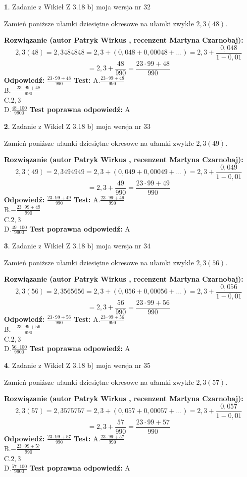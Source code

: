 \documentclass[12pt, a4paper]{article}
\theoremstyle{definition} %
\newtheorem{zad}{}
\newcommand{\zadStart}[1]{\begin{zad}#1\newline}
\newcommand{\zadStop}{\end{zad}}
\newcommand{\rozwStart}[2]{\noindent \textbf{Rozwiązanie (autor #1 , recenzent #2): }\newline}
\newcommand{\rozwStop}{\newline}
\newcommand{\odpStart}{\noindent \textbf{Odpowiedź:}\newline}
\newcommand{\odpStop}{\newline}
\newcommand{\testStart}{\noindent \textbf{Test:}\newline}
\newcommand{\testStop}{\newline}
\newcommand{\kluczStart}{\noindent \textbf{Test poprawna odpowiedź:}\newline}
\newcommand{\kluczStop}{\newline}
\begin{document}
\zadStart{Zadanie z Wikieł Z 3.18 b) moja wersja nr 32}

Zamień poniższe ułamki dziesiętne okresowe na ułamki zwykłe $2,3(48)$.
\zadStop
\rozwStart{Patryk Wirkus}{Martyna Czarnobaj}
$$2,3(48)=2,3484848=2,3+(0,048+0,00048+...)=2,3+\frac{0,048}{1-0,01}$$
$$=2,3+\frac{48}{990}=\frac{23\cdot99+48}{990}$$
\rozwStop
\odpStart
$\frac{23\cdot99+48}{990}$
\odpStop
\testStart
A.$\frac{23\cdot99+48}{990}$\\ B.$-\frac{23\cdot99+48}{990}$\\ C.$2,3$\\ D.$\frac{48\cdot100}{9900}$
\testStop
\kluczStart
A
\kluczStop



\zadStart{Zadanie z Wikieł Z 3.18 b) moja wersja nr 33}

Zamień poniższe ułamki dziesiętne okresowe na ułamki zwykłe $2,3(49)$.
\zadStop
\rozwStart{Patryk Wirkus}{Martyna Czarnobaj}
$$2,3(49)=2,3494949=2,3+(0,049+0,00049+...)=2,3+\frac{0,049}{1-0,01}$$
$$=2,3+\frac{49}{990}=\frac{23\cdot99+49}{990}$$
\rozwStop
\odpStart
$\frac{23\cdot99+49}{990}$
\odpStop
\testStart
A.$\frac{23\cdot99+49}{990}$\\ B.$-\frac{23\cdot99+49}{990}$\\ C.$2,3$\\ D.$\frac{49\cdot100}{9900}$
\testStop
\kluczStart
A
\kluczStop



\zadStart{Zadanie z Wikieł Z 3.18 b) moja wersja nr 34}

Zamień poniższe ułamki dziesiętne okresowe na ułamki zwykłe $2,3(56)$.
\zadStop
\rozwStart{Patryk Wirkus}{Martyna Czarnobaj}
$$2,3(56)=2,3565656=2,3+(0,056+0,00056+...)=2,3+\frac{0,056}{1-0,01}$$
$$=2,3+\frac{56}{990}=\frac{23\cdot99+56}{990}$$
\rozwStop
\odpStart
$\frac{23\cdot99+56}{990}$
\odpStop
\testStart
A.$\frac{23\cdot99+56}{990}$\\ B.$-\frac{23\cdot99+56}{990}$\\ C.$2,3$\\ D.$\frac{56\cdot100}{9900}$
\testStop
\kluczStart
A
\kluczStop



\zadStart{Zadanie z Wikieł Z 3.18 b) moja wersja nr 35}

Zamień poniższe ułamki dziesiętne okresowe na ułamki zwykłe $2,3(57)$.
\zadStop
\rozwStart{Patryk Wirkus}{Martyna Czarnobaj}
$$2,3(57)=2,3575757=2,3+(0,057+0,00057+...)=2,3+\frac{0,057}{1-0,01}$$
$$=2,3+\frac{57}{990}=\frac{23\cdot99+57}{990}$$
\rozwStop
\odpStart
$\frac{23\cdot99+57}{990}$
\odpStop
\testStart
A.$\frac{23\cdot99+57}{990}$\\ B.$-\frac{23\cdot99+57}{990}$\\ C.$2,3$\\ D.$\frac{57\cdot100}{9900}$
\testStop
\kluczStart
A
\kluczStop
\end{document}
